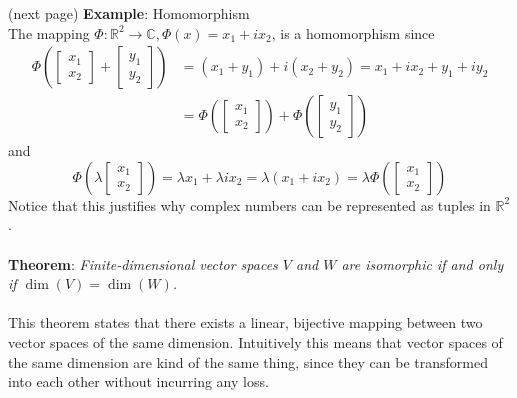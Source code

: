\documentclass{report}
\begin{document}
(next page)
\newpage
\noindent\textbf{Example}: Homomorphism\\
The mapping $\Phi:\mathbb{R}^2\rightarrow\mathbb{C},\Phi(x)=x_1+ix_2$, is a homomorphism since
\begin{align*}
\Phi\left(\begin{bmatrix}x_1\\x_2\end{bmatrix}+
\begin{bmatrix}y_1\\y_2\end{bmatrix}\right)
&=(x_1+y_1)+i(x_2+y_2)=x_1+ix_2+y_1+iy_2\\
&=\Phi\left(\begin{bmatrix}x_1\\x_2\end{bmatrix}\right)
+\Phi\left(\begin{bmatrix}y_1\\y_2\end{bmatrix}\right)
\end{align*}
and
\begin{equation*}
\Phi\left(\lambda\begin{bmatrix}x_1\\x_2\end{bmatrix}\right)=\lambda x_1+\lambda ix_2=\lambda(x_1+ix_2)
=\lambda\Phi\left(\begin{bmatrix}x_1\\x_2\end{bmatrix}\right)
\end{equation*}
Notice that this justifies why complex numbers can be represented as tuples in $\mathbb{R}^2$.\\
\vspace{1mm}\\
\textbf{Theorem}: \textit{Finite-dimensional vector spaces $V$ and $W$ are isomorphic
if and only if $\dim(V)=\dim(W)$.}\\
\vspace{1mm}\\
This theorem states that there exists a linear, bijective mapping between two vector
spaces of the same dimension. Intuitively this means that vector spaces
of the same dimension are kind of the same thing, since they can be 
transformed into each other without incurring any loss.
\newpage
\end{document}
